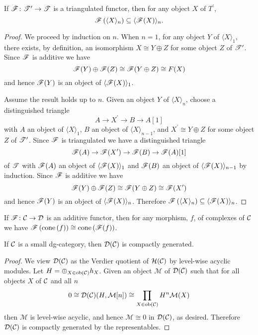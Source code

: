 \documentclass[dissertation.tex]{subfiles}
\begin{document}
\begin{lem}\label{TriangulatedFunctorsPreserveGens}
  If $\mathscr{F} \colon \mathscr{T}^\prime \to \mathscr{T}$ is a triangulated functor, then for any object $X$ of $T^\prime$, 
  $$\mathscr{F}\left(\langle X \rangle_n\right) \subseteq \langle \mathscr{F}(X) \rangle_n.$$

  \begin{proof}
    We proceed by induction on $n$.
    When $n = 1$, for any object $Y$ of $\langle X \rangle_1$, there exists, by definition, an isomorphism $X \cong Y \oplus Z$ for some object $Z$ of $\mathscr{T}^\prime$.
    Since $\mathscr{F}$ is additive we have
    $$\mathscr{F}(Y) \oplus \mathscr{F}(Z) \cong \mathscr{F}(Y \oplus Z) \cong F(X)$$
    and hence $\mathscr{F}(Y)$ is an object of $\langle \mathscr{F}(X) \rangle_1$.

    Assume the result holds up to $n$.
    Given an object $Y$ of $\langle X \rangle_n$, choose a distinguished triangle
    $$A \to X^\prime \to B \to A[1]$$
    with $A$ an object of $\langle X \rangle_1$, $B$ an object of $\langle X \rangle_{n-1}$, and $X^\prime \cong Y \oplus Z$ for some object $Z$ of $\mathscr{T}^\prime$.
    Since $\mathscr{F}$ is triangulated we have a distinguished triangle
    $$\mathscr{F}(A) \to \mathscr{F}(X^\prime) \to \mathscr{F}(B) \to \mathscr{F}(A)[1]$$
    of $\mathscr{T}$ with $\mathscr{F}(A)$ an object of $\langle \mathscr{F}(X) \rangle_1$ and $\mathscr{F}(B)$ an object of $\langle \mathscr{F}(X) \rangle_{n-1}$ by induction.
    Since $\mathscr{F}$ is additive we have
    $$\mathscr{F}(Y) \oplus \mathscr{F}(Z) \cong \mathscr{F}(Y \oplus Z) \cong \mathscr{F}(X^\prime)$$
    and hence $\mathscr{F}(Y)$ is an object of $\langle \mathscr{F}(X) \rangle_n$.
    Therefore $\mathscr{F}\left(\langle X \rangle_n\right) \subseteq \langle \mathscr{F}(X) \rangle_n$.
  \end{proof}
\end{lem}

\begin{lem}\label{AdditiveFunctorsCommuteWithCones}
  If $\mathscr{F} \colon \mathcal{C} \rightarrow \mathcal{D}$ is an additive functor, then for any morphism, $f$, of complexes of $\mathcal{C}$ we have
  $\mathscr{F}\left(\operatorname{cone}\left(f\right)\right) \cong \operatorname{cone}\left(\mathscr{F}(f)\right)$.
\end{lem}

\begin{lem}\label{RepresentablesGenerateSmallDG}
  If $\mathcal{C}$ is a small dg-category, then $\mathcal{D}(\mathcal{C})$ is compactly generated.

  \begin{proof}
    We view $\mathcal{D}(\mathcal{C})$ as the Verdier quotient of $\mathcal{H}(\mathcal{C})$ by level-wise acyclic modules.
    Let $H = \oplus_{X \in \operatorname{ob}\left(\mathcal{C}\right)} h_X$.
    Given an object $\mathcal{M}$ of $\mathcal{D}(\mathcal{C})$ such that for all objects $X$ of $\mathcal{C}$ and all $n$
    $$0 \cong \mathcal{D}(\mathcal{C})(H, \mathcal{M}[n]) \cong \prod_{X \in \operatorname{ob}\left(\mathcal{C}\right)} H^n\mathcal{M}(X)$$
    then $\mathcal{M}$ is level-wise acyclic, and hence $\mathcal{M} \cong 0$ in $\mathcal{D}(\mathcal{C})$, as desired.
    Therefore $\mathcal{D}(\mathcal{C})$ is compactly generated by the representables.
  \end{proof}
\end{lem}
\end{document}
